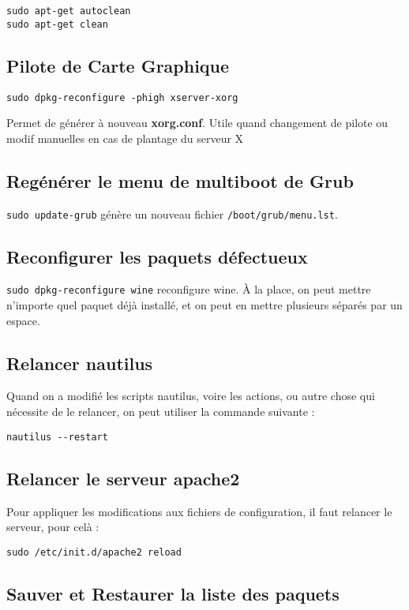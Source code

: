 \documentclass[a4paper,twoside]{article}
\begin{document}
\begin{verbatim}
sudo apt-get autoclean
sudo apt-get clean
\end{verbatim}


\subsection{Pilote de Carte Graphique}
\verb|sudo dpkg-reconfigure -phigh xserver-xorg|

Permet de générer à nouveau \textbf{xorg.conf}. Utile quand changement de pilote ou modif manuelles en cas de plantage du serveur X

\subsection{Regénérer le menu de multiboot de Grub}
\verb|sudo update-grub| génère un nouveau fichier \verb|/boot/grub/menu.lst|.

\subsection{Reconfigurer les paquets défectueux}
\verb|sudo dpkg-reconfigure wine| reconfigure wine. \`A la place, on peut mettre n'importe quel paquet déjà installé, et on peut en mettre plusieurs séparés par un espace.

\subsection{Relancer nautilus}
Quand on a modifié les scripts nautilus, voire les actions, ou autre chose qui nécessite de le relancer, on peut utiliser la commande suivante :
\begin{verbatim}
nautilus --restart
\end{verbatim}

\subsection{Relancer le serveur apache2}
Pour appliquer les modifications aux fichiers de configuration, il faut relancer le serveur, pour celà :
\begin{verbatim}
sudo /etc/init.d/apache2 reload
\end{verbatim}



\subsection{Sauver et Restaurer la liste des paquets}
\end{document}
